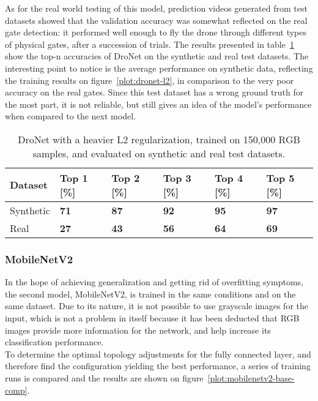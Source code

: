 As for the real world testing of this model, prediction videos generated from
test datasets showed that the validation accuracy was somewhat reflected on the
real gate detection: it performed well enough to fly the drone through
different types of physical gates, after a succession of trials. The results
presented in table~\ref{table:dronet} show the top-n accuracies of DroNet on
the synthetic and real test datasets. The interesting point to notice is the
average performance on synthetic data, reflecting the training results on
figure~\ref{plot:dronet-l2}, in comparison to the very poor accuracy on the real
gates. Since this test dataset has a wrong ground truth for the most part, it
is not reliable, but still gives an idea of the model's performance when
compared to the next model.

\begin{table}[!h]
    \centering
    \caption[Top-N accuracies for DroNet on real and synthetic test
    datasets]{DroNet with a heavier L2 regularization, trained on 150,000 RGB
    samples, and evaluated on synthetic and real test datasets.}
    \begin{tabular}{llllll}
        \toprule
        Dataset & Top 1 [\%] & Top 2 [\%] & Top 3 [\%] & Top 4 [\%] & Top 5 [\%]\\
        \midrule         
        Synthetic & \textbf{71} & \textbf{87} & \textbf{92} & \textbf{95} &
        \textbf{97} \\ 
        Real & \textbf{27} & \textbf{43} & \textbf{56} & \textbf{64} &
        \textbf{69} \\
        \bottomrule
    \end{tabular}
    \label{table:dronet}
\end{table}

\subsubsection{MobileNetV2}

In the hope of achieving generalization and getting rid of overfitting
symptoms, the second model, MobileNetV2, is trained in the same conditions and
on the same dataset. Due to its nature, it is not possible to use grayscale
images for the input, which is not a problem in itself because it has been
deducted that RGB images provide more information for the network, and help
increase its classification performance.\\

To determine the optimal topology adjustments for the fully connected layer,
and therefore find the configuration yielding the best performance, a series of
training runs is compared and the results are shown on
figure~\ref{plot:mobilenetv2-base-comp}.


